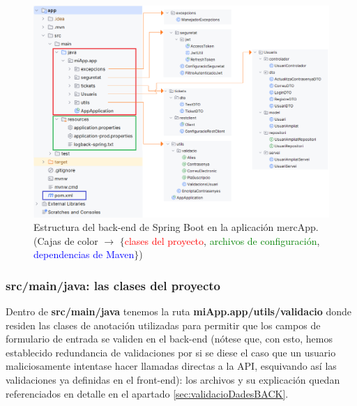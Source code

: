 \documentclass[a4paper,12pt]{report}
\begin{document}
				
				\setlength{\belowcaptionskip}{3pt}
				\FloatBarrier
				\begin{figure}[H]
					\centering
					\caption{Estructura del back-end de Spring Boot en la aplicación mercApp. \\ {\footnotesize (Cajas de color $\rightarrow$ $\{$\textcolor{red}{clases del proyecto}, \textcolor{green}{archivos de configuración}, \textcolor{blue}{dependencias de Maven}$\}$) }}
					\includegraphics[width=1\textwidth]{img/estrucutraAplicacioJAVARESOURCES_final_rallat.png}
					
					\label{fig:estrucutraAplicacioJAVARESOURCES} 
				\end{figure}
				\FloatBarrier
				
				

				

				\subsubsection{src/main/java: las clases del proyecto}
				
				
				Dentro de \textbf{src/main/java} tenemos la ruta \textbf{miApp.app/utils/validacio}	donde residen las clases de anotación utilizadas para permitir que los campos de formulario de entrada se validen en el back-end (nótese que, con esto, hemos establecido redundancia de validaciones por si se diese el caso que un usuario maliciosamente intentase hacer llamadas directas a la API, esquivando así las validaciones ya definidas en el front-end): los archivos y su explicación quedan referenciados en detalle en el apartado \ref{sec:validacioDadesBACK}.
				
\end{document}
